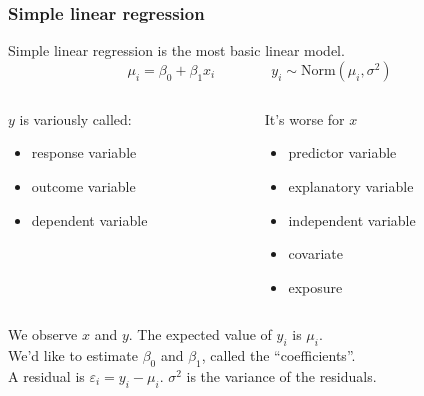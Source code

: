 \documentclass[color=usenames,dvipsnames]{beamer}\usepackage[]{graphicx}\usepackage[]{xcolor}
\begin{document}
\begin{frame}
  \frametitle{Simple linear regression}
  Simple linear regression is the most basic linear model.
  \[
    \mu_i = \beta_0 + \beta_1 x_i \qquad \qquad
    y_i \sim \mathrm{Norm}(\mu_i, \sigma^2)
  \]
  \vspace{-6pt}
  \pause
  \begin{columns}[T]
    \begin{column}{0.5\textwidth}
      $y$ is variously called:
      \begin{itemize}
        \item response variable
        \item outcome variable
        \item dependent variable
      \end{itemize}
    \end{column}
    \pause
    \begin{column}{0.5\textwidth}
      It's worse for $x$
      \begin{itemize}
        \item predictor variable
        \item explanatory variable
        \item independent variable
        \item covariate
        \item exposure
      \end{itemize}
    \end{column}
  \end{columns}
  \pause
  \vfill
  We observe $x$ and $y$. The expected value of $y_i$ is $\mu_i$. \\
  \vfill
  We'd like to estimate $\beta_0$ and $\beta_1$, called the ``coefficients''. \\
  \pause
  \vfill
  A residual is $\varepsilon_i=y_i-\mu_i$. $\sigma^2$ is the variance of the residuals.
\end{frame}



\end{document}
